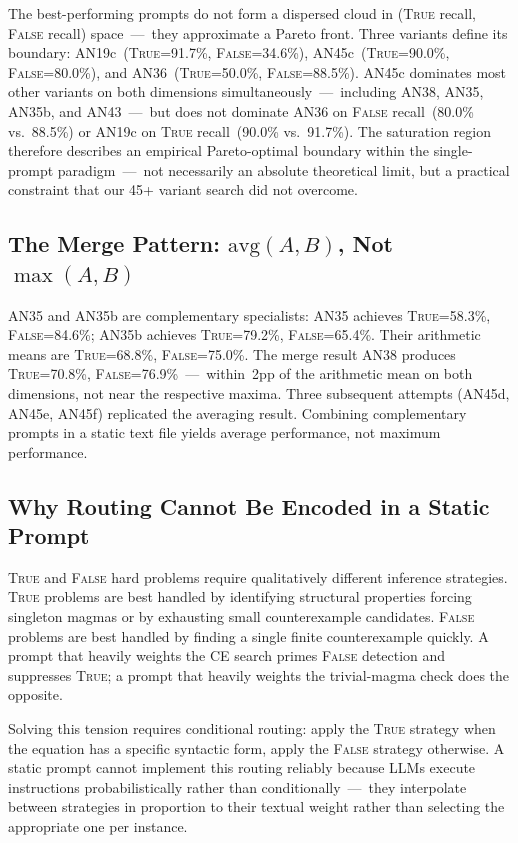 \documentclass[11pt]{article}
\begin{document}
The best-performing prompts do not form a dispersed cloud in
(\textsc{True} recall, \textsc{False} recall) space~---~they
approximate a Pareto front. Three variants define its boundary:
AN19c~(\textsc{True}=91.7\%, \textsc{False}=34.6\%),
AN45c~(\textsc{True}=90.0\%, \textsc{False}=80.0\%), and
AN36~(\textsc{True}=50.0\%, \textsc{False}=88.5\%). AN45c dominates
most other variants on both dimensions simultaneously~---~including
AN38, AN35, AN35b, and AN43~---~but does not dominate AN36 on
\textsc{False} recall~(80.0\% vs.~88.5\%) or AN19c on \textsc{True}
recall~(90.0\% vs.~91.7\%). The saturation region therefore describes
an empirical Pareto-optimal boundary within the single-prompt paradigm~---~not
necessarily an absolute theoretical limit, but a practical constraint
that our 45+ variant search did not overcome.

\subsection{The Merge Pattern: $\mathrm{avg}(A,B)$, Not $\max(A,B)$}

AN35 and AN35b are complementary specialists: AN35 achieves
\textsc{True}=58.3\%, \textsc{False}=84.6\%; AN35b achieves
\textsc{True}=79.2\%, \textsc{False}=65.4\%. Their arithmetic means
are \textsc{True}=68.8\%, \textsc{False}=75.0\%. The merge result AN38
produces \textsc{True}=70.8\%, \textsc{False}=76.9\%~---~within~2pp
of the arithmetic mean on both dimensions, not near the respective
maxima. Three subsequent attempts (AN45d, AN45e, AN45f) replicated the
averaging result. Combining complementary prompts in a static text file
yields average performance, not maximum performance.

\subsection{Why Routing Cannot Be Encoded in a Static Prompt}

\textsc{True} and \textsc{False} hard problems require qualitatively
different inference strategies. \textsc{True} problems are best handled
by identifying structural properties forcing singleton magmas or by
exhausting small counterexample candidates. \textsc{False} problems are
best handled by finding a single finite counterexample quickly. A
prompt that heavily weights the CE search primes \textsc{False}
detection and suppresses \textsc{True}; a prompt that heavily weights
the trivial-magma check does the opposite.

Solving this tension requires conditional routing: apply the
\textsc{True} strategy when the equation has a specific syntactic form,
apply the \textsc{False} strategy otherwise. A static prompt cannot
implement this routing reliably because LLMs execute instructions
probabilistically rather than conditionally~---~they interpolate
between strategies in proportion to their textual weight rather than
selecting the appropriate one per instance.
\end{document}
